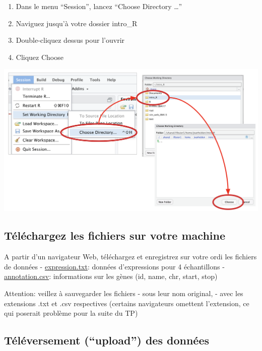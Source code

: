 \documentclass[
]{book}
\providecommand{\tightlist}{%
  \setlength{\itemsep}{0pt}\setlength{\parskip}{0pt}}
\begin{document}
\begin{enumerate}
\def\labelenumi{\arabic{enumi}.}
\tightlist
\item
  Dans le menu ``Session'', lancez ``Choose Directory \ldots{}''
\item
  Naviguez jusqu'à votre dossier intro\_R
\item
  Double-cliquez dessus pour l'ouvrir
\item
  Cliquez Choose
\end{enumerate}

\includegraphics{images/setWd.png}

\hypertarget{tuxe9luxe9chargez-les-fichiers-sur-votre-machine}{%
\subsection{Téléchargez les fichiers sur votre machine}\label{tuxe9luxe9chargez-les-fichiers-sur-votre-machine}}

A partir d'un navigateur Web, téléchargez et enregistrez sur votre ordi les fichiers de données
- \href{https://raw.githubusercontent.com/IFB-ElixirFr/EBAII/master/2022/ebaiin1/intro_R/expression.txt}{expression.txt}: données d'expressions pour 4 échantillons
- \href{https://raw.githubusercontent.com/IFB-ElixirFr/EBAII/master/2022/ebaiin1/intro_R/annotation.csv}{annotation.csv}: informations sur les gènes (id, name, chr, start, stop)

Attention: veillez à sauvegarder les fichiers
- sous leur nom original,
- avec les extensions .txt et .csv respectives (certains navigateurs omettent l'extension, ce qui poserait problème pour la suite du TP)

\hypertarget{tuxe9luxe9versement-upload-des-donnuxe9es}{%
\subsection{Téléversement (``upload'') des données}\label{tuxe9luxe9versement-upload-des-donnuxe9es}}
\end{document}
